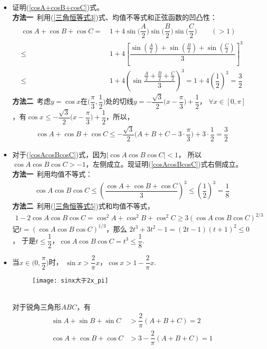 \begin{itemize}[leftmargin=\inteval{\myitemleftmargin}pt,itemsep=
   \inteval{\myitemitempsep}pt,topsep=\inteval{\myitemtopsep}pt]
\item 证明(\ref{cosA+cosB+cosC})式。\\
\textbf{方法一}\ 利用(\ref{三角恒等式3})式、均值不等式和正弦函数的凹凸性：
\begin{align}
    \cos A +\cos B +\cos C =&\ 1+4\sin\Big(\dfrac{A}{2}\Big)
    \sin\Big(\dfrac{B}{2}\Big)\sin\Big(\dfrac{C}{2}\Big)\qquad (>1) \nonumber \\
    \leq &\ 1+4\left[\dfrac{\sin(\frac{A}{2})+
        \sin(\frac{B}{2})+\sin(\frac{C}{2})}{3}\right]^3 \nonumber \\
    \leq &\ 1+ 4\left(\sin \dfrac{\frac{A}{2}+\frac{B}{2}+\frac{C}{2}}{3}\right)^3=
    1+4\left(\dfrac{1}{2}\right)^3=\dfrac{3}{2} \label{三个余弦和不等式-小于}
\end{align}
\textbf{方法二}\ 考虑$ y=\cos x $在$ \Big(\dfrac{\pi}{3},\dfrac{1}{2}
\Big) $处的切线$ y=-\dfrac{\sqrt{3}}{2}\Big(x-\dfrac{\pi}{3}\Big)+\dfrac{1}{2} $，
$ \forall x\in [0,\pi] $，有$ \cos x\leq -\dfrac{\sqrt{3}}{2}\Big(x-
\dfrac{\pi}{3}\Big)+\dfrac{1}{2} $，所以，
\begin{gather*}
    \cos A +\cos B +\cos C \leq -\dfrac{\sqrt{3}}{2}\Big(A+B+C-3\cdot
    \dfrac{\pi}{3}\Big)+3\cdot\dfrac{1}{2}=\dfrac{3}{2}
\end{gather*}

\item 对于(\ref{cosAcosBcosC})式，因为$ |\cos A\cos B\cos C|<1 $，
所以$ \cos A\cos B\cos C>-1 $，左侧成立。现证明(\ref{cosAcosBcosC})式右侧成立。\\
\textbf{方法一}\ 利用均值不等式：
\begin{gather*}
    \cos A \cos B \cos C \leq \left(\dfrac{\cos A +\cos B +\cos C}{3} \right)^3
    \leq \left(\dfrac{1}{2}\right)^3=\dfrac{1}{8}
\end{gather*}
\textbf{方法二}\ 利用(\ref{三角恒等式5})式和均值不等式，
\begin{align*}
    1-2\cos A\cos B\cos C=\cos^2A+\cos^2B+\cos^2C \geq 3(\cos A\cos B\cos C)^{2/3}
\end{align*}
记$ t=(\cos A\cos B\cos C)^{1/3} $，那么 $ 2t^3+3t^2-1= (2t-1)(t+1)^2 \leq 0 $，
于是$ t\leq \dfrac{1}{2} $，$ \cos A\cos B \cos C=t^3\leq \dfrac{1}{8} $.  

\item 当$ x\in\Big(0,\dfrac{\pi}{2}\Big) $时，
$ \sin x>\dfrac{2}{\pi}x $，$ \cos x>1-\dfrac{2}{\pi}x $.
\begin{figure}[!h]
    \centering
    \texttt{[image: sinx大于2x\_pi]}
\end{figure} \\
对于锐角三角形$ ABC $，有
\begin{align*}
    \sin A +\sin B +\sin C &>\dfrac{2}{\pi}(A+B+C)=2 \\
    \cos A +\cos B +\cos C &>3-\dfrac{2}{\pi}(A+B+C)=1
\end{align*}


\end{itemize}

